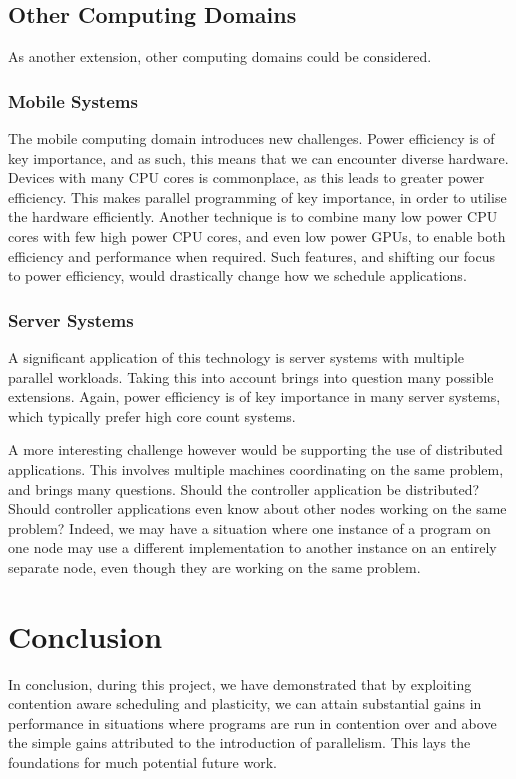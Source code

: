 \subsection{Other Computing Domains}
\label{section:conclusion_and_future_work:other_computing_domains}

As another extension, other computing domains could be considered.

\subsubsection{Mobile Systems}
\label{section:conclusion_and_future_work:mobile_systems}

The mobile computing domain introduces new challenges. Power efficiency is of key importance, and as such, this means that we can encounter diverse hardware. Devices with many CPU cores is commonplace, as this leads to greater power efficiency. This makes parallel programming of key importance, in order to utilise the hardware efficiently. Another technique is to combine many low power CPU cores with few high power CPU cores, and even low power GPUs, to enable both efficiency and performance when required. Such features, and shifting our focus to power efficiency, would drastically change how we schedule applications.



\subsubsection{Server Systems}
\label{section:conclusion_and_future_work:server_systems}

A significant application of this technology is server systems with multiple parallel workloads. Taking this into account brings into question many possible extensions. Again, power efficiency is of key importance in many server systems, which typically prefer high core count systems. 

A more interesting challenge however would be supporting the use of distributed applications. This involves multiple machines coordinating on the same problem, and brings many questions. Should the controller application be distributed? Should controller applications even know about other nodes working on the same problem? Indeed, we may have a situation where one instance of a program on one node may use a different implementation to another instance on an entirely separate node, even though they are working on the same problem.



\section{Conclusion}

In conclusion, during this project, we have demonstrated that by exploiting contention aware scheduling and plasticity, we can attain substantial gains in performance in situations where programs are run in contention over and above the simple gains attributed to the introduction of parallelism. This lays the foundations for much potential future work.